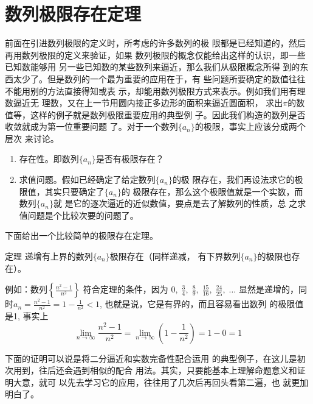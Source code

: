\section{数列极限存在定理}
前面在引进数列极限的定义时，所考虑的许多数列的极
限都是已经知道的，然后再用数列极限的定义来验证，如果
数列极限的概念仅能给出这样的认识，即一些已知数能够用
另一些已知数的某些数列来逼近，那么我们从极限概念所得
到的东西太少了。但是数列的一个最为重要的应用在于，有
些问题所要确定的数值往往不能用别的方法直接得知或表
示，却能用数列极限方式来表示。例如我们用有理数逼近无
理数，又在上一节用圆内接正多边形的面积来逼近圆面积，
求出$\pi$的数值等，这样的例子就是数列极限重要应用的典型例
子。因此我们构造的数列是否收敛就成为第一位重要问题
了。对于一个数列$\{a_n\}$的极限，事实上应该分成两个层次
来讨论。

\begin{enumerate}
    \item 存在性。即数列$\{a_n\}$是否有极限存在？
    \item 求值问题。假如已经确定了给定数列$\{a_n\}$的极
限存在，我们再设法求它的极限值，其实只要确定了$\{a_n\}$的
极限存在，那么这个极限值就是一个实数，而数列$\{a_n\}$就
是它的逐次逼近的近似数值，要点是去了解数列的性质，总
之求值问题是个比较次要的问题了。 
\end{enumerate}

下面给出一个比较简单的极限存在定理。

\begin{blk}{定理}
    递增有上界的数列$\{a_n\}$极限存在（同样递减，
有下界数列$\{a_n\}$的极限也存在）。
\end{blk}
 
例如：数列$\left\{\frac{n^2-1}{n^2}\right\}$
符合定理的条件，因为
$0,\; \frac{3}{4},\; \frac{8}{9},\; \frac{15}{16},\; \frac{24}{25},\; \ldots$
显然是递增的，同时$a_n=\frac{n^2-1}{n^2}=1-\frac{1}{n^2}<1$, 也就是说，它是有界的，而且容易看出数列
的极限值是1, 事实上
\[\lim_{n\to\infty}\frac{n^2-1}{n^2}=\lim_{n\to\infty}\left(1-\frac{1}{n^2}\right)=1-0=1\]

下面的证明可以说是将二分逼近和实数完备性配合运用
的典型例子，在这儿是初次用到，往后还会遇到相似的配合
用法。其实，只要能基本上理解命题意义和证明大意，就可
以先去学习它的应用，往往用了几次后再回头看第二遍，也
就更加明白了。

